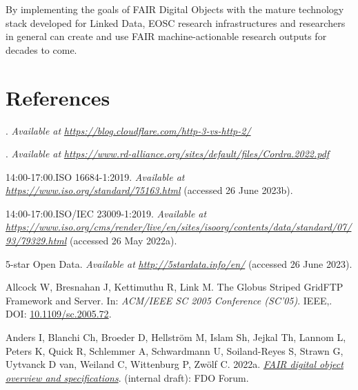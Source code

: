 By implementing the goals of FAIR Digital Objects with the mature technology stack developed for Linked Data, EOSC research infrastructures and researchers in general can create and use FAIR machine-actionable research outputs for decades to come.

\hypertarget{references}{%
\section{References}\label{references}}

\hypertarget{refs}{}
\begin{CSLReferences}{1}{0}
\leavevmode{}%
. \emph{Available at} \href{https://blog.cloudflare.com/http-3-vs-http-2/}{\emph{https://blog.cloudflare.com/http-3-vs-http-2/}}

\leavevmode{}%
. \emph{Available at} \href{https://www.rd-alliance.org/sites/default/files/Cordra.2022.pdf}{\emph{https://www.rd-alliance.org/sites/default/files/Cordra.2022.pdf}}

\leavevmode{}%
14:00-17:00.ISO 16684-1:2019. \emph{Available at} \href{https://www.iso.org/standard/75163.html}{\emph{https://www.iso.org/standard/75163.html}} (accessed 26 June 2023b).

\leavevmode{}%
14:00-17:00.ISO/IEC 23009-1:2019. \emph{Available at} \href{https://www.iso.org/cms/render/live/en/sites/isoorg/contents/data/standard/07/93/79329.html}{\emph{https://www.iso.org/cms/render/live/en/sites/isoorg/contents/data/standard/07/93/79329.html}} (accessed 26 May 2022a).

\leavevmode{}%
5-star Open Data. \emph{Available at} \href{http://5stardata.info/en/}{\emph{http://5stardata.info/en/}} (accessed 26 June 2023).

\leavevmode{}%
Allcock W, Bresnahan J, Kettimuthu R, Link M. The Globus Striped GridFTP Framework and Server. In: \emph{ACM/IEEE SC 2005 Conference (SC'05)}. IEEE,. DOI: \href{https://doi.org/10.1109/sc.2005.72}{10.1109/sc.2005.72}.

\leavevmode{}%
Anders I, Blanchi Ch, Broeder D, Hellström M, Islam Sh, Jejkal Th, Lannom L, Peters K, Quick R, Schlemmer A, Schwardmann U, Soiland-Reyes S, Strawn G, Uytvanck D van, Weiland C, Wittenburg P, Zwölf C. 2022a. \emph{\href{https://docs.google.com/document/d/1GAj-1owAAPDF7hVis2dYPPCOHiPHrIXIo4j-S5AdEFI/edit}{FAIR digital object overview and specifications}}. (internal draft): FDO Forum.


\end{CSLReferences}
